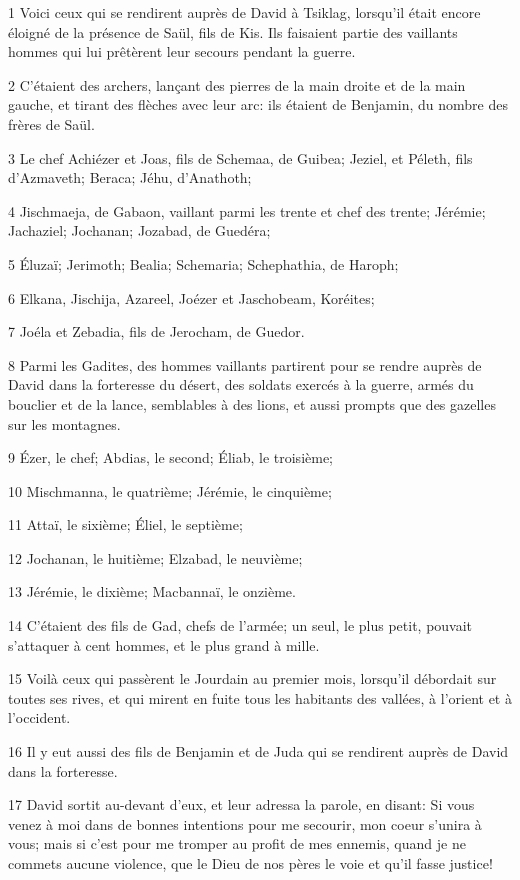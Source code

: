 \par 1 Voici ceux qui se rendirent auprès de David à Tsiklag, lorsqu'il était encore éloigné de la présence de Saül, fils de Kis. Ils faisaient partie des vaillants hommes qui lui prêtèrent leur secours pendant la guerre.
\par 2 C'étaient des archers, lançant des pierres de la main droite et de la main gauche, et tirant des flèches avec leur arc: ils étaient de Benjamin, du nombre des frères de Saül.
\par 3 Le chef Achiézer et Joas, fils de Schemaa, de Guibea; Jeziel, et Péleth, fils d'Azmaveth; Beraca; Jéhu, d'Anathoth;
\par 4 Jischmaeja, de Gabaon, vaillant parmi les trente et chef des trente; Jérémie; Jachaziel; Jochanan; Jozabad, de Guedéra;
\par 5 Éluzaï; Jerimoth; Bealia; Schemaria; Schephathia, de Haroph;
\par 6 Elkana, Jischija, Azareel, Joézer et Jaschobeam, Koréites;
\par 7 Joéla et Zebadia, fils de Jerocham, de Guedor.
\par 8 Parmi les Gadites, des hommes vaillants partirent pour se rendre auprès de David dans la forteresse du désert, des soldats exercés à la guerre, armés du bouclier et de la lance, semblables à des lions, et aussi prompts que des gazelles sur les montagnes.
\par 9 Ézer, le chef; Abdias, le second; Éliab, le troisième;
\par 10 Mischmanna, le quatrième; Jérémie, le cinquième;
\par 11 Attaï, le sixième; Éliel, le septième;
\par 12 Jochanan, le huitième; Elzabad, le neuvième;
\par 13 Jérémie, le dixième; Macbannaï, le onzième.
\par 14 C'étaient des fils de Gad, chefs de l'armée; un seul, le plus petit, pouvait s'attaquer à cent hommes, et le plus grand à mille.
\par 15 Voilà ceux qui passèrent le Jourdain au premier mois, lorsqu'il débordait sur toutes ses rives, et qui mirent en fuite tous les habitants des vallées, à l'orient et à l'occident.
\par 16 Il y eut aussi des fils de Benjamin et de Juda qui se rendirent auprès de David dans la forteresse.
\par 17 David sortit au-devant d'eux, et leur adressa la parole, en disant: Si vous venez à moi dans de bonnes intentions pour me secourir, mon coeur s'unira à vous; mais si c'est pour me tromper au profit de mes ennemis, quand je ne commets aucune violence, que le Dieu de nos pères le voie et qu'il fasse justice!
